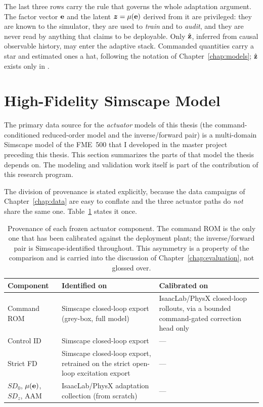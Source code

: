 The last three rows carry the rule that governs the whole adaptation
argument. The factor vector $\mathbf{e}$ and the latent
$\bm{z} = \mu(\mathbf{e})$ derived from it are privileged: they are
known to the simulator, they are used to \emph{train} and to
\emph{audit}, and they are never read by anything that claims to be
deployable. Only $\hat{\mathbf{z}}$, inferred from causal observable history,
may enter the adaptive stack. Commanded quantities carry a star and
estimated ones a hat, following the notation of
Chapter~\ref{chap:models}; $\hat{\mathbf{z}}$ exists only in \ppoIDAAMFD.

\section{High-Fidelity Simscape Model}
\label{sec:sys:simscape}

The primary data source for the \emph{actuator} models of this thesis
(the command-conditioned reduced-order model and the inverse/forward
pair) is a multi-domain Simscape model of the FME~500 that I
developed in the master project preceding this thesis. This section
summarizes the parts of that model the thesis depends on. The modeling
and validation work itself is part of the contribution of this research
program.

The division of provenance is stated explicitly, because the data campaigns
of Chapter~\ref{chap:data} are easy to conflate and the three actuator
paths do \emph{not} share the same one.
Table~\ref{tab:sys:provenance} states it once.

\begin{table}[tb]
  \centering
  \caption{Provenance of each frozen actuator component. The command ROM
  is the only one that has been calibrated against the deployment plant;
  the inverse/forward pair is Simscape-identified throughout. This
  asymmetry is a property of the comparison and is carried into the
  discussion of Chapter~\ref{chap:evaluation}, not glossed over.}
  \label{tab:sys:provenance}
  \small
  \begin{tabular}{lp{4.4cm}p{5.0cm}}
    \toprule
    Component & Identified on & Calibrated on \\
    \midrule
    Command ROM & Simscape closed-loop export (grey-box, full model)
      & IsaacLab/PhysX closed-loop rollouts, via a bounded command-gated
        correction head only \\
    Control ID & Simscape closed-loop export & --- \\
    Strict FD & Simscape closed-loop export, retrained on the strict
        open-loop excitation export & --- \\
    $SD_0$, $\mu(\mathbf{e})$, $SD_z$, AAM
      & IsaacLab/PhysX adaptation collection (from scratch) & --- \\
    \bottomrule
  \end{tabular}
\end{table}

